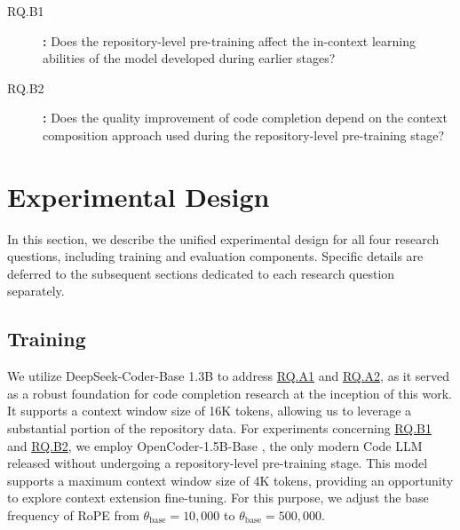 \begin{sloppypar}
\begin{description}
    \item[RQ.B1]\label{rq:rq-b1} \textbf{:} Does the repository-level pre-training affect the in-context learning abilities of the model developed during earlier stages?
    \item[RQ.B2]\label{rq:rq-b2} \textbf{:} Does the quality improvement of code completion depend on the context composition approach used during the repository-level pre-training stage?
\end{description}
\end{sloppypar}

\section{Experimental Design}

In this section, we describe the unified experimental design for all four research questions, including training and evaluation components. Specific details are deferred to the subsequent sections dedicated to each research question separately.

\subsection{Training}\label{sec:training}

We utilize DeepSeek-Coder-Base 1.3B \parencite{guo2024} to address \hyperref[rq:rq-a1]{RQ.A1} and \hyperref[rq:rq-a2]{RQ.A2}, as it served as a robust foundation for code completion research at the inception of this work. It supports a context window size of 16K tokens, allowing us to leverage a substantial portion of the repository data. For experiments concerning \hyperref[rq:rq-b1]{RQ.B1} and \hyperref[rq:rq-b2]{RQ.B2}, we employ OpenCoder-1.5B-Base \parencite{huang2024}, the only modern Code LLM released without undergoing a repository-level pre-training stage. This model supports a maximum context window size of 4K tokens, providing an opportunity to explore context extension fine-tuning. For this purpose, we adjust the base frequency of RoPE from \(\theta_{\mathrm{base}} = 10{,}000\) to \(\theta_{\mathrm{base}} = 500{,}000\).

